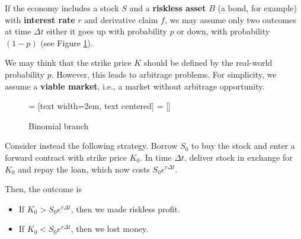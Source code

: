 


If the economy includes a stock $S$ and a \textbf{riskless asset} $B$ (a bond, for example) with \textbf{interest rate} $r$ and derivative claim $f$, we may assume only two outcomes at time $\Delta t$ either it goes up with probability $p$ or down, with probability $(1-p)$ (see Figure \ref{fig:bin_branch}).

We may think that the strike price $K$ should be defined by the real-world probability $p$. However, this leads to arbitrage problems. For simplicity, we assume a \textbf{viable market}, i.e., a market without arbitrage opportunity.

\begin{figure}[h]
    \begin{center}
         = [text width=2em, text centered]
         = []
    \end{center}
    \caption{Binomial branch}
    \label{fig:bin_branch}
\end{figure}

Consider instead the following strategy. Borrow $S_0$ to buy the stock and enter a forward contract with strike price $K_0$. In time $\Delta t$, deliver stock in exchange for $K_0$ and repay the loan, which now costs $S_0 e^{r \Delta t}$. 

Then, the outcome is 

\begin{itemize}
    \item If $K_0 > S_0 e^{r \Delta t}$, then we made riskless profit.
    \item If $K_0 < S_0 e^{r \Delta t}$, then we lost money. 
\end{itemize}

